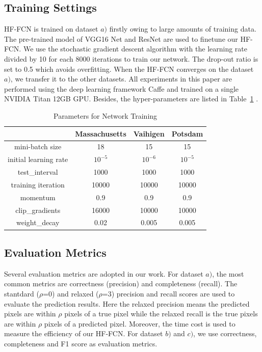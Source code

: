 \subsection{Training Settings}
HF-FCN is trained on dataset ${a)}$ firstly owing to large amounts of training data. The pre-trained model of VGG16 Net and ResNet are used to finetune our HF-FCN. We use the stochastic gradient descent algorithm with the learning rate divided by 10 for each 8000 iterations to train our network. The drop-out ratio is set to 0.5 which avoids overfitting. When the HF-FCN converges on the dataset ${a)}$, we transfer it to the other datasets. All experiments in this paper are performed using the deep learning framework Caffe and trained on a single NVIDIA Titan 12GB GPU. Besides, the hyper-parameters are listed in Table~\ref{table:Train-Parameter} .

\begin{table}
\centering
\caption {Parameters for Network Training}
\label{table:Train-Parameter}
\begin{tabular}{c|c|c|c}
\hline
&Massachusetts &Vaihigen &Potsdam\\  \hline
mini-batch size & 18& 15 & 15 \\
initial learning rate & $10^{-5}$ & $10^{-6}$ & $10^{-5}$\\
test\_interval&1000 & 1000 &1000\\
training iteration & 10000 & 10000& 10000\\
momentum & 0.9 & 0.9 & 0.9\\
clip\_gradients & 16000& 10000 & 10000\\
weight\_decay & 0.02& 0.005 & 0.005\\ \hline
\end{tabular}
\end{table}

\subsection{Evaluation Metrics}
Several evaluation metrics are adopted in our work. For dataset ${a)}$, the most common metrics are correctness (precision) and completeness (recall).
The stantdard ($\rho$=0) and relaxed ($\rho$=3) precision and recall scores are used to evaluate the prediction results. Here the relaxed precision means the predicted pixels are within $\rho$ pixels of a true pixel while the relaxed recall is the true pixels are within $\rho$ pixels of a predicted pixel. Moreover, the time cost is used to measure the efficiency of our HF-FCN. For dataset ${b)}$ and ${c)}$, we use correctness, completeness and F1 score as evaluation metrics.


